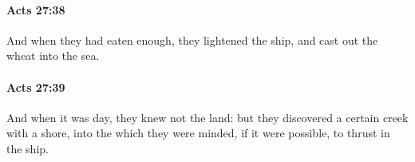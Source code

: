 		\paragraph{Acts 27:38} %
			\label{ACTS-27-38}

			And when they had eaten enough, they lightened the ship, and cast out the wheat into the sea.

			\begin{framed}
			\scriptsize
				\begin{compactdesc}
					\item[SBLG] 
				\end{compactdesc}
			\end{framed}

		\paragraph{Acts 27:39} %
			\label{ACTS-27-39}

			And when it was day, they knew not the land: but they discovered a certain creek with a shore, into the which they were minded, if it were possible, to thrust in the ship.

